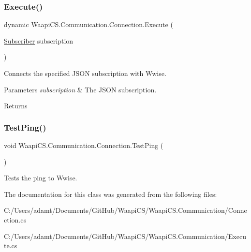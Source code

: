 \subsubsection{\texorpdfstring{Execute()}{Execute()}\hspace{0.1cm}{\footnotesize\ttfamily [2/2]}}
{\footnotesize\ttfamily dynamic Waapi\+C\+S.\+Communication.\+Connection.\+Execute (\begin{DoxyParamCaption}\item[{\mbox{\hyperlink{class_waapi_c_s_1_1_communication_1_1_subscriber}{Subscriber}}}]{subscription }\end{DoxyParamCaption})}



Connects the specified J\+S\+ON subscription with Wwise. 


\begin{DoxyParams}{Parameters}
{\em subscription} & The J\+S\+ON subscription.\\
\hline
\end{DoxyParams}
\begin{DoxyReturn}{Returns}

\end{DoxyReturn}
\mbox{\label{class_waapi_c_s_1_1_communication_1_1_connection_a96ee59b454b0721752d4520a0aa49515}} 
\subsubsection{\texorpdfstring{Test\+Ping()}{TestPing()}}
{\footnotesize\ttfamily void Waapi\+C\+S.\+Communication.\+Connection.\+Test\+Ping (\begin{DoxyParamCaption}{ }\end{DoxyParamCaption})}



Tests the ping to Wwise. 



The documentation for this class was generated from the following files\+:\begin{DoxyCompactItemize}
\item 
C\+:/\+Users/adamt/\+Documents/\+Git\+Hub/\+Waapi\+C\+S/\+Waapi\+C\+S.\+Communication/Connection.\+cs\item 
C\+:/\+Users/adamt/\+Documents/\+Git\+Hub/\+Waapi\+C\+S/\+Waapi\+C\+S.\+Communication/Execute.\+cs\end{DoxyCompactItemize}
